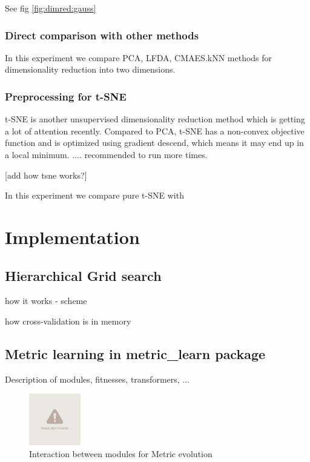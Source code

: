 \documentclass[12pt,a4paper]{report}
\begin{document}
See fig \ref{fig:dimred:gauss}

\subsection{Direct comparison with other methods}

In this experiment we compare PCA, LFDA, CMAES.kNN methods for dimensionality reduction into two dimensions.

\subsection{Preprocessing for t-SNE}

t-SNE \cite{maaten2008visualizing} is another unsupervised dimensionality reduction method which is getting a lot of attention recently. Compared to PCA, t-SNE has a non-convex objective function and is optimized using gradient descend, which means it may end up in a local minimum. .... recommended to run more times.

[add how tsne works?]

In this experiment we compare pure t-SNE with


\chapter{Implementation} \label{chap:impl}

\section{Hierarchical Grid search}

how it works - scheme

how cross-validation is in memory

\section{Metric learning in metric\_learn package}

Description of modules, fitnesses, transformers, ...

\begin{figure}[h!] \label{fig:implementation-modules}
	\centering
    \includegraphics[width=0.2\textwidth]{img/notfound}
    \caption{Interaction between modules for Metric evolution}
\end{figure}
\end{document}
